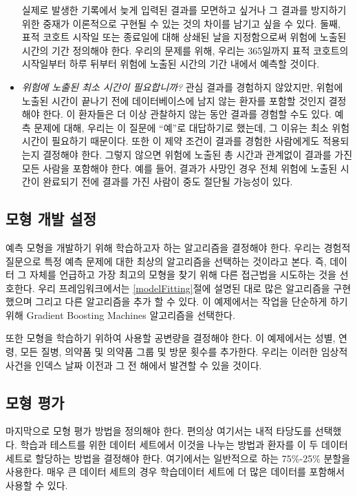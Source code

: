\documentclass[11pt]{book}
\theoremstyle{definition}
\theoremstyle{definition}
\theoremstyle{definition}
\theoremstyle{remark}
\begin{document}
\begin{itemize}
  실제로 발생한 기록에서 늦게 입력된 결과를 모면하고 싶거나 그 결과를
  방지하기 위한 중재가 이론적으로 구현될 수 있는 것의 차이를 남기고 싶을
  수 있다. 둘째, 표적 코호트 시작일 또는 종료일에 대해 상쇄된 날을
  지정함으로써 위험에 노출된 시간의 기간 정의해야 한다. 우리의 문제를
  위해, 우리는 365일까지 표적 코호트의 시작일부터 하루 뒤부터 위험에
  노출된 시간의 기간 내에서 예측할 것이다.
\item
  \emph{위험에 노출된 최소 시간이 필요합니까?} 관심 결과를 경험하지
  않았지만, 위험에 노출된 시간이 끝나기 전에 데이터베이스에 남지 않는
  환자를 포함할 것인지 결정해야 한다. 이 환자들은 더 이상 관찰하지 않는
  동안 결과를 경험할 수도 있다. 예측 문제에 대해, 우리는 이 질문에
  ``예''로 대답하기로 했는데, 그 이유는 최소 위험 시간이 필요하기
  때문이다. 또한 이 제약 조건이 결과를 경험한 사람에게도 적용되는지
  결정해야 한다. 그렇지 않으면 위험에 노출된 총 시간과 관계없이 결과를
  가진 모든 사람을 포함해야 한다. 예를 들어, 결과가 사망인 경우 전체
  위험에 노출된 시간이 완료되기 전에 결과를 가진 사람이 중도 절단될
  가능성이 있다.
\end{itemize}

\subsection{모형 개발 설정}\label{--}

예측 모형을 개발하기 위해 학습하고자 하는 알고리즘을 결정해야 한다.
우리는 경험적 질문으로 특정 예측 문제에 대한 최상의 알고리즘을 선택하는
것이라고 본다. 즉, 데이터 그 자체를 언급하고 가장 최고의 모형을 찾기
위해 다른 접근법을 시도하는 것을 선호한다. 우리 프레임워크에서는
\ref{modelFitting}절에 설명된 대로 많은 알고리즘을 구현했으며 그리고
다른 알고리즘을 추가 할 수 있다. 이 예제에서는 작업을 단순하게 하기 위해
Gradient Boosting Machines 알고리즘을 선택한다.

또한 모형을 학습하기 위하여 사용할 공변량을 결정해야 한다. 이 예제에서는
성별, 연령, 모든 질병, 의약품 및 의약품 그룹 및 방문 횟수를 추가한다.
우리는 이러한 임상적 사건을 인덱스 날짜 이전과 그 전 해에서 발견할 수
있을 것이다.

\subsection{모형 평가}\label{-}

마지막으로 모형 평가 방법을 정의해야 한다. 편의상 여기서는 내적 타당도를
선택했다. 학습과 테스트를 위한 데이터 세트에서 이것을 나누는 방법과
환자를 이 두 데이터 세트로 할당하는 방법을 결정해야 한다. 여기에서는
일반적으로 하는 75\%-25\% 분할을 사용한다. 매우 큰 데이터 세트의 경우
학습데이터 세트에 더 많은 데이터를 포함해서 사용할 수 있다.
\end{document}
